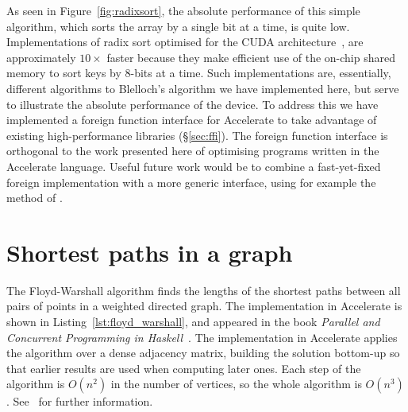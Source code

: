 As seen in Figure~\ref{fig:radixsort}, the absolute performance of this simple
algorithm, which sorts the array by a single bit at a time, is quite low.
Implementations of radix sort optimised for the CUDA
architecture~\cite{Satish:2009kx,Merrill:2011bz,ThrustAParallelT:ub}, are
approximately $10\times$ faster because they make efficient use of the on-chip
shared memory to sort keys by 8-bits at a time. Such implementations are,
essentially, different algorithms to Blelloch's algorithm we have implemented
here, but serve to illustrate the absolute performance of the device. To address
this we have implemented a foreign function interface for Accelerate to take
advantage of existing high-performance libraries (\S\ref{sec:ffi}). The foreign
function interface is orthogonal to the work presented here of optimising
programs written in the Accelerate language. Useful future work would be to
combine a fast-yet-fixed foreign implementation with a more generic interface,
using for example the method of \citet{Henglein:2013dd}.


\section{Shortest paths in a graph}
\label{sec:floyd_warshall}

The Floyd-Warshall algorithm finds the lengths of the shortest paths between all
pairs of points in a weighted directed graph. The implementation in Accelerate
is shown in Listing~\ref{lst:floyd_warshall}, and appeared in the book
\emph{Parallel and Concurrent Programming in Haskell}~\cite{Marlow:2013wn}. The
implementation in Accelerate applies the algorithm over a dense adjacency
matrix, building the solution bottom-up so that earlier results are used when
computing later ones. Each step of the algorithm is $O\left(n^2\right)$ in the
number of vertices, so the whole algorithm is $O\left(n^3\right)$.
See~\cite{Marlow:2013wn} for further information.


